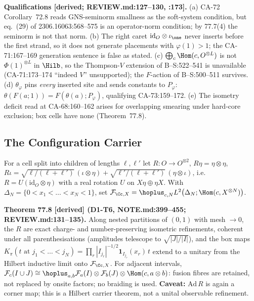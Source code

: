 \textbf{Qualifications [derived; REVIEW.md:127--130, :173].}
(a) CA-72 Corollary~72.8 reads GNS-seminorm smallness as the soft-system
condition, but eq.~(29) of 2306.16063:568--575 is an operator-norm condition;
by 77.7(4) the seminorm is not that norm.
(b) The right caret \(\mathrm{id}_O\otimes\iota_\one\) never inserts before the
first strand, so it does not generate placements with \(\varphi(1)>1\); the
CA-71:167--169 generation sentence is false as stated.
(c) \(\bigoplus_c\Hom(c,O^{\otimes L})\) is not \(\Phi(1)^{\otimes L}\) in
\(\Hilb\), so the Thompson-\(V\) extension of B--S:522--541 is unavailable
(CA-71:173--174 ``indeed \(V\)'' unsupported); the \(F\)-action of B--S:500--511 survives.
(d) \(\theta_\varphi\) pins \emph{every} inserted site and sends constants to
\(P_\varphi\): \(\theta(F(a;1))=F(\theta(a);P_\varphi)\), qualifying CA-73:159--172.
(e) The isometry deficit read at CA-68:160--162 arises for overlapping
smearing under hard-core exclusion; box cells have none (Theorem~77.8).

\subsection{The Configuration Carrier}

For a cell split into children of lengths \(\ell,\ell'\) let \(R:O\to O^{\otimes2}\),
\(R\eta=\eta\otimes\eta\),
\(R\iota=\sqrt{\ell/(\ell{+}\ell')}\,(\iota\otimes\eta)+\sqrt{\ell'/(\ell{+}\ell')}\,(\eta\otimes\iota)\),
i.e.\ \(R=U(\mathrm{id}_O\otimes\eta)\) with a real rotation \(U\) on \(X\eta\oplus\eta X\).
With \(\Delta_N=\{0<x_1<\dots<x_N<1\}\), set
\(\mathcal F_{\Cc,X}=\hoplus_{c,N}L^2\big(\Delta_N;\Hom(c,X^{\otimes N})\big)\).

\textbf{Theorem 77.8 [derived] (D1-T6, NOTE.md:399--455; REVIEW.md:131--135).}
Along nested partitions of \((0,1)\) with mesh \(\to0\), the \(R\) are exact
charge- and number-preserving isometric refinements, coherent under all
parenthesisations (amplitudes telescope to \(\sqrt{|J|/|I|}\)), and the box maps
\(K_\pi(t\text{ at }j_1<\dots<j_N)=\prod_r|I_{j_r}|^{-1/2}\mathbf 1_{I_{j_r}}(x_r)\,t\)
extend to a unitary from the Hilbert inductive limit onto \(\mathcal F_{\Cc,X}\).
For adjacent intervals,
\(\mathcal F_c(I\cup J)\cong\hoplus_{a,b}\mathcal F_a(I)\otimes\mathcal F_b(J)\otimes\Hom(c,a\otimes b)\):
fusion fibres are retained, not replaced by onsite factors; no braiding is used.
\textbf{Caveat:} \(\mathrm{Ad}\,R\) is again a corner map; this is a Hilbert
carrier theorem, not a unital observable refinement.

